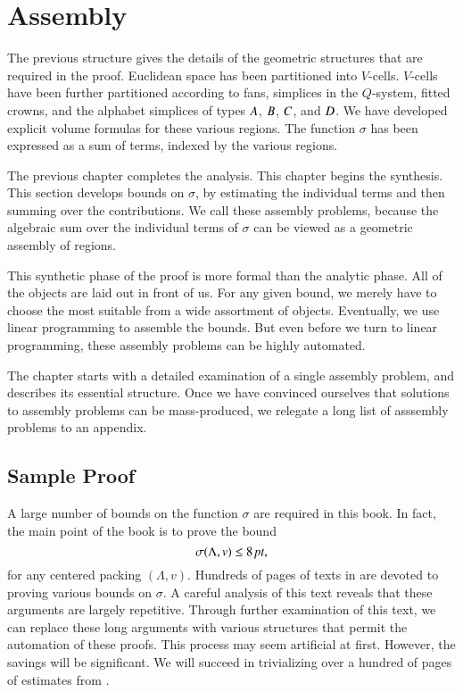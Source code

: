 

\chapter{Assembly}

The previous structure gives the details of the geometric structures
that are required in the proof.  Euclidean space has been partitioned
into  $V$-cells.  $V$-cells have been further partitioned according
to fans, simplices in the $Q$-system, fitted crowns, and
the alphabet simplices
of types $A$, $B$, $C$, and $D$.   We have developed explicit
volume formulas for these various regions.  The function $\sigma$
has been expressed as a sum of terms, indexed by the various regions.

The previous chapter completes the analysis.  This chapter begins the
synthesis.
This section develops bounds on $\sigma$, by estimating the individual
terms and then summing over the contributions.  We call these assembly
problems, because the 
algebraic sum over the individual terms of $\sigma$
can be viewed as a geometric assembly of regions.

This synthetic phase of the proof is more formal than the analytic phase.
All of the objects are laid out in front of us.  For any given bound, 
we merely have to choose the most suitable
from a wide assortment of objects.  Eventually, we use linear programming
to assemble the bounds.  But even before we turn to linear programming,
these assembly problems can be highly automated.

The chapter starts with a detailed examination of a single assembly
problem, and describes its essential structure.  Once we have convinced
ourselves that solutions to assembly problems can be mass-produced,
we relegate a long list of asssembly problems to an appendix.


\section{Sample Proof}

A large number of bounds on the function
$\sigma$ are required in this book.  In fact, the main
point of the book is to prove the bound
  $$
  \sigma(\Lambda,v)\le 8\,\hbox{\it pt},
  $$
for any centered packing $(\Lambda,v)$.
Hundreds of pages of texts in \cite{DCG} are devoted to
proving various bounds on $\sigma$.  A careful analysis of
this text reveals that these arguments are largely repetitive.
Through further examination of this text, we can replace these
long arguments with various structures that permit the automation
of these proofs.  This process may seem artificial at first.
However, the savings will be significant.  We will succeed in
trivializing over a hundred of pages of estimates from \cite{DCG}.

